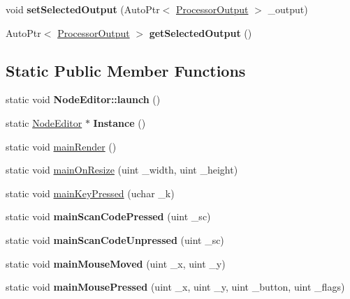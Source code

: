 \begin{DoxyCompactItemize}
\item 
\mbox{\label{class_chill_1_1_node_editor_a3d3c6eb135f7a258b62d60eda8894d03}} 
void {\bfseries set\+Selected\+Output} (Auto\+Ptr$<$ \mbox{\hyperlink{class_chill_1_1_processor_output}{Processor\+Output}} $>$ \+\_\+output)
\item 
\mbox{\label{class_chill_1_1_node_editor_a8a906341d76dc5fa8a8ea85b45fd4680}} 
Auto\+Ptr$<$ \mbox{\hyperlink{class_chill_1_1_processor_output}{Processor\+Output}} $>$ {\bfseries get\+Selected\+Output} ()
\end{DoxyCompactItemize}
\subsection*{Static Public Member Functions}
\begin{DoxyCompactItemize}
\item 
\mbox{\label{class_chill_1_1_node_editor_a36965a05441d70eabf6ca4313ec127a6}} 
static void {\bfseries Node\+Editor\+::launch} ()
\item 
\mbox{\label{class_chill_1_1_node_editor_ab1f2859cc0841b13290a1f1cb3516965}} 
static \mbox{\hyperlink{class_chill_1_1_node_editor}{Node\+Editor}} $\ast$ {\bfseries Instance} ()
\item 
static void \mbox{\hyperlink{class_chill_1_1_node_editor_accabf149df9cb481956ef3c0132252f8}{main\+Render}} ()
\item 
static void \mbox{\hyperlink{class_chill_1_1_node_editor_a94f29235392656e4c60c3aa0d81c646a}{main\+On\+Resize}} (uint \+\_\+width, uint \+\_\+height)
\item 
static void \mbox{\hyperlink{class_chill_1_1_node_editor_a0abdd4a4d4026177be77a8e59f4aa5cf}{main\+Key\+Pressed}} (uchar \+\_\+k)
\item 
\mbox{\label{class_chill_1_1_node_editor_a5033568fec5142f98f6cd6881a38103f}} 
static void {\bfseries main\+Scan\+Code\+Pressed} (uint \+\_\+sc)
\item 
\mbox{\label{class_chill_1_1_node_editor_ac47a6c0b50d9105e34c39aaf66c8c28f}} 
static void {\bfseries main\+Scan\+Code\+Unpressed} (uint \+\_\+sc)
\item 
\mbox{\label{class_chill_1_1_node_editor_a61540bc669952d0fe214de5e82e50ec3}} 
static void {\bfseries main\+Mouse\+Moved} (uint \+\_\+x, uint \+\_\+y)
\item 
\mbox{\label{class_chill_1_1_node_editor_af01b8b889b0e9182c9ab3e3fa58f0320}} 
static void {\bfseries main\+Mouse\+Pressed} (uint \+\_\+x, uint \+\_\+y, uint \+\_\+button, uint \+\_\+flags)
\end{DoxyCompactItemize}
